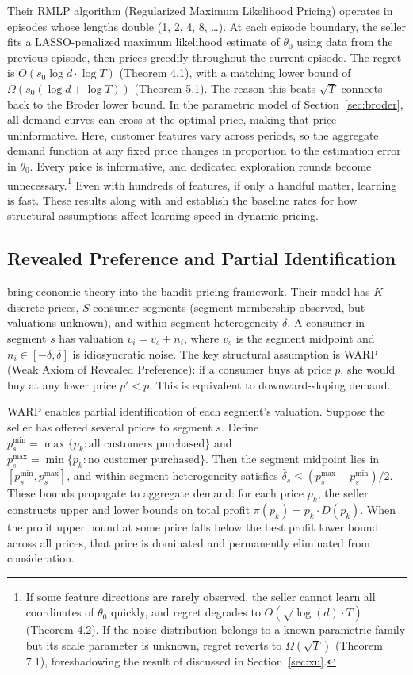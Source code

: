 Their RMLP algorithm (Regularized Maximum Likelihood Pricing) operates in episodes whose lengths double (1, 2, 4, 8, \ldots). At each episode boundary, the seller fits a LASSO-penalized maximum likelihood estimate of $\theta_0$ using data from the previous episode, then prices greedily throughout the current episode. The regret is $O(s_0 \log d \cdot \log T)$ (Theorem 4.1), with a matching lower bound of $\Omega(s_0 (\log d + \log T))$ (Theorem 5.1). The reason this beats $\sqrt{T}$ connects back to the Broder lower bound. In the parametric model of Section~\ref{sec:broder}, all demand curves can cross at the optimal price, making that price uninformative. Here, customer features vary across periods, so the aggregate demand function at any fixed price changes in proportion to the estimation error in $\theta_0$. Every price is informative, and dedicated exploration rounds become unnecessary.\footnote{If some feature directions are rarely observed, the seller cannot learn all coordinates of $\theta_0$ quickly, and regret degrades to $O(\sqrt{\log(d) \cdot T})$ (Theorem 4.2). If the noise distribution belongs to a known parametric family but its scale parameter is unknown, regret reverts to $\Omega(\sqrt{T})$ (Theorem 7.1), foreshadowing the result of \citet{Xu2021} discussed in Section~\ref{sec:xu}.} Even with hundreds of features, if only a handful matter, learning is fast. These results along with \citet{Kleinberg2003} and \citet{Broder2012} establish the baseline rates for how structural assumptions affect learning speed in dynamic pricing.

\subsection{Revealed Preference and Partial Identification}
\label{sec:misra}

\citet{Misra2019} bring economic theory into the bandit pricing framework. Their model has $K$ discrete prices, $S$ consumer segments (segment membership observed, but valuations unknown), and within-segment heterogeneity $\delta$. A consumer in segment $s$ has valuation $v_i = v_s + n_i$, where $v_s$ is the segment midpoint and $n_i \in [-\delta, \delta]$ is idiosyncratic noise. The key structural assumption is WARP (Weak Axiom of Revealed Preference): if a consumer buys at price $p$, she would buy at any lower price $p' < p$. This is equivalent to downward-sloping demand. 

WARP enables partial identification of each segment's valuation. Suppose the seller has offered several prices to segment $s$. Define $p_s^{\min} = \max\{p_k : \text{all customers purchased}\}$ and $p_s^{\max} = \min\{p_k : \text{no customer purchased}\}$. Then the segment midpoint lies in $[p_s^{\min}, p_s^{\max}]$, and within-segment heterogeneity satisfies $\hat{\delta}_s \leq (p_s^{\max} - p_s^{\min})/2$. These bounds propagate to aggregate demand: for each price $p_k$, the seller constructs upper and lower bounds on total profit $\pi(p_k) = p_k \cdot D(p_k)$. When the profit upper bound at some price falls below the best profit lower bound across all prices, that price is dominated and permanently eliminated from consideration.

